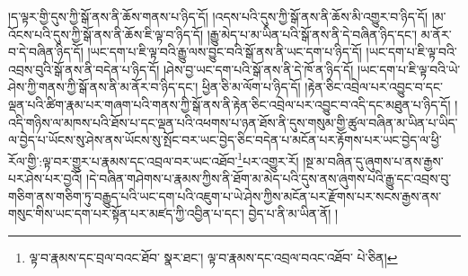 །ད་ལྟར་གྱི་དུས་ཀྱི་སྒོ་ནས་ནི་ཆོས་གནས་པ་ཉིད་དོ། །འདས་པའི་དུས་ཀྱི་སྒོ་ནས་ནི་ཆོས་མི་འགྱུར་བ་ཉིད་དོ། །མ་འོངས་པའི་དུས་ཀྱི་སྒོ་ནས་ནི་ཆོས་ཇི་ལྟ་བ་ཉིད་དོ། །རྒྱུ་མེད་པ་མ་ཡིན་པའི་སྒོ་ནས་ནི་དེ་བཞིན་ཉིད་དང་། མ་ནོར་བ་དེ་བཞིན་ཉིད་དོ། །ཡང་དག་པ་ཇི་ལྟ་བའི་རྒྱུ་ལས་བྱུང་བའི་སྒོ་ནས་ནི་ཡང་དག་པ་ཉིད་དོ། །ཡང་དག་པ་ཇི་ལྟ་བའི་འབྲས་བུའི་སྒོ་ནས་ནི་བདེན་པ་ཉིད་དོ། །ཤེས་བྱ་ཡང་དག་པའི་སྒོ་ནས་ནི་དེ་ཁོ་ན་ཉིད་དོ། །ཡང་དག་པ་ཇི་ལྟ་བའི་ཡེ་ཤེས་ཀྱི་གནས་ཀྱི་སྒོ་ནས་ནི་མ་ནོར་བ་ཉིད་དང་། ཕྱིན་ཅི་མ་ལོག་པ་ཉིད་དོ། །རྟེན་ཅིང་འབྲེལ་པར་འབྱུང་བ་དང་ལྡན་པའི་ཚིག་རྣམ་པར་གཞག་པའི་གནས་ཀྱི་སྒོ་ནས་ནི་རྟེན་ཅིང་འབྲེལ་པར་འབྱུང་བ་འདི་དང་མཐུན་པ་ཉིད་དོ། །འདི་གཉིས་ལ་མཁས་པའི་ཐོས་པ་དང་ལྡན་པའི་འཕགས་པ་ཉན་ཐོས་ནི་དུས་གསུམ་གྱི་ཚུལ་བཞིན་མ་ཡིན་པ་ཡིད་ལ་བྱེད་པ་ཡོངས་སུ་ཤེས་ནས་ཡོངས་སུ་སྤོང་བར་ཡང་བྱེད་ཅིང་བདེན་པ་མངོན་པར་རྟོགས་པར་ཡང་བྱེད་ལ་ཕྱི་རོལ་གྱི་:ལྟ་བར་གྱུར་པ་རྣམས་དང་འབྲལ་བར་ཡང་འཐོབ་\footnote{ལྟ་བ་རྣམས་དང་བྲལ་བའང་ཐོབ་  སྣར་ཐང་། ལྟ་བ་རྣམས་དང་འབྲལ་བའང་འཐོབ་  པེ་ཅིན། }པར་འགྱུར་རོ། །སྔ་མ་བཞིན་དུ་ཞུགས་པ་ནས་རྒྱས་པར་ཤེས་པར་བྱའོ། །དེ་བཞིན་གཤེགས་པ་རྣམས་ཀྱིས་ནི་ཐོག་མ་མེད་པའི་དུས་ནས་ཞུགས་པའི་རྒྱུ་དང་འབྲས་བུ་གཅིག་ནས་གཅིག་ཏུ་བརྒྱུད་པའི་ཡང་དག་པའི་འཇུག་པ་ཡེ་ཤེས་ཀྱིས་མངོན་པར་རྫོགས་པར་སངས་རྒྱས་ནས་གསུང་གིས་ཡང་དག་པར་སྟོན་པར་མཛད་ཀྱི་འབྱིན་པ་དང་། བྱེད་པ་ནི་མ་ཡིན་ནོ། །
